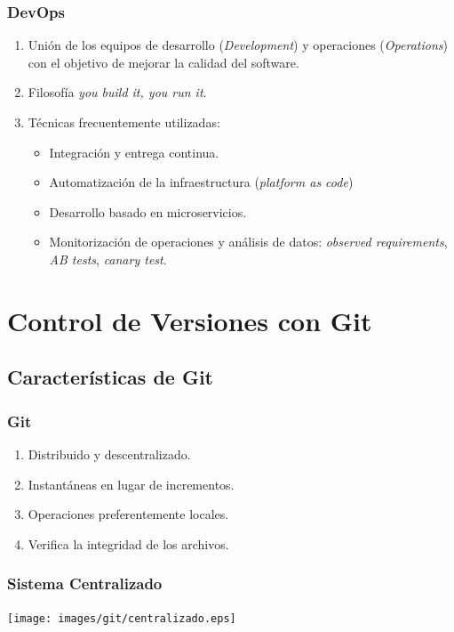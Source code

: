 \documentclass[hanbdout,a4paper,slidestop,dvips,xcolor=pst,blue]{beamer}
\begin{document}
\begin{frame}[c]
	\frametitle{DevOps}
	\begin{enumerate}[<+->]
	   \item Unión de los equipos de desarrollo (\emph{Development}) y operaciones (\emph{Operations}) con el objetivo de mejorar la calidad del software.
       \item Filosofía \emph{you build it, you run it}.
       \item Técnicas frecuentemente utilizadas:
            \begin{itemize}
                \item Integración y entrega continua.
                \item Automatización de la infraestructura (\emph{platform as code})
                \item Desarrollo basado en microservicios.
                \item Monitorización de operaciones y análisis de datos: \emph{observed requirements}, \emph{AB tests}, \emph{canary test}.
            \end{itemize}
    \end{enumerate}	
\end{frame}

\section{Control de Versiones con Git}

\subsection{Características de Git}

\begin{frame}[c]
	\frametitle{Git}
	 \begin{enumerate}[<+->]
        \item Distribuido y descentralizado.
        \item Instantáneas en lugar de incrementos.
        \item Operaciones preferentemente locales.
        \item Verifica la integridad de los archivos.
	 \end{enumerate}
\end{frame}

\begin{frame}[c]
	\frametitle{Sistema Centralizado}
	 \begin{center}
		\texttt{[image: images/git/centralizado.eps]}
	 \end{center}
\end{frame}
\end{document}
